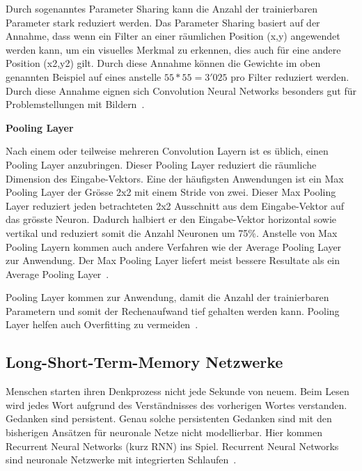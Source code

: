 Durch sogenanntes Parameter Sharing kann die Anzahl der trainierbaren Parameter stark reduziert werden. Das Parameter Sharing basiert auf der Annahme, dass wenn ein Filter an einer räumlichen Position (x,y) angewendet werden kann, um ein visuelles Merkmal zu erkennen, dies auch für eine andere Position (x2,y2) gilt. Durch diese Annahme können die Gewichte im oben genannten Beispiel auf eines anstelle $55*55 = 3'025$ pro Filter reduziert werden. Durch diese Annahme eignen sich Convolution Neural Networks besonders gut für Problemstellungen mit Bildern~\autocite{CNN}. 

\textbf{Pooling Layer}

Nach einem oder teilweise mehreren Convolution Layern ist es üblich, einen Pooling Layer anzubringen. Dieser Pooling Layer reduziert die räumliche Dimension des Eingabe-Vektors. Eine der häufigsten Anwendungen ist ein Max Pooling Layer der Grösse 2x2 mit einem Stride von zwei. Dieser Max Pooling Layer reduziert jeden betrachteten 2x2 Ausschnitt aus dem Eingabe-Vektor auf das grösste Neuron. Dadurch halbiert er den Eingabe-Vektor horizontal sowie vertikal und reduziert somit die Anzahl Neuronen um 75\%. Anstelle von Max Pooling Layern kommen auch andere Verfahren wie der Average Pooling Layer zur Anwendung. Der Max Pooling Layer liefert meist bessere Resultate als ein Average Pooling Layer~\autocite{CNN}.

Pooling Layer kommen zur Anwendung, damit die Anzahl der trainierbaren Parametern und somit der Rechenaufwand tief gehalten werden kann. Pooling Layer helfen auch Overfitting zu vermeiden~\autocite{CNN}.

\subsection{Long-Short-Term-Memory Netzwerke}

Menschen starten ihren Denkprozess nicht jede Sekunde von neuem. Beim Lesen wird jedes Wort aufgrund des Verständnisses des vorherigen Wortes verstanden. Gedanken sind persistent. Genau solche persistenten Gedanken sind mit den bisherigen Ansätzen für neuronale Netze nicht modellierbar. Hier kommen Recurrent Neural Networks (kurz RNN) ins Spiel. Recurrent Neural Networks sind neuronale Netzwerke mit integrierten Schlaufen~\autocite{Olah2015}. 

